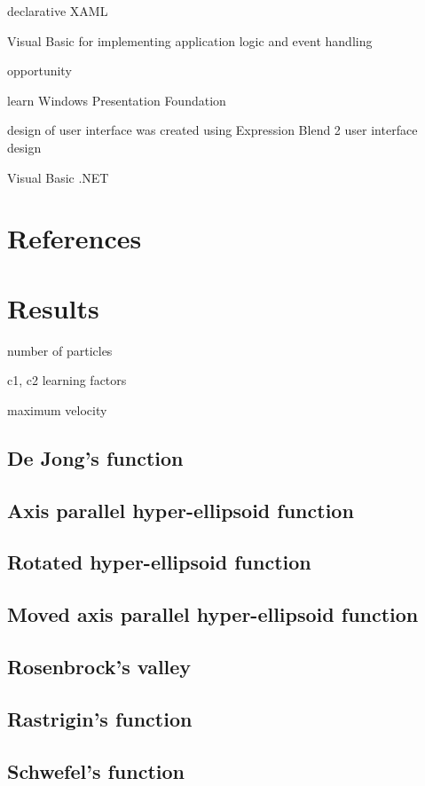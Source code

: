\documentclass[a4paper,11pt,twocolumn]{article}
\begin{document}
declarative XAML

Visual Basic for implementing application logic and event handling

opportunity

learn Windows Presentation Foundation

design of user interface was created using
Expression Blend 2 user interface design

Visual Basic .NET

\section{References}

\appendix

\section{Results}

number of particles

c1, c2 learning factors

maximum velocity



\subsection{De Jong's function}
\subsection{Axis parallel hyper-ellipsoid function}
\subsection{Rotated hyper-ellipsoid function}
\subsection{Moved axis parallel hyper-ellipsoid function}
\subsection{Rosenbrock's valley}
\subsection{Rastrigin's function}
\subsection{Schwefel's function}
\end{document}
